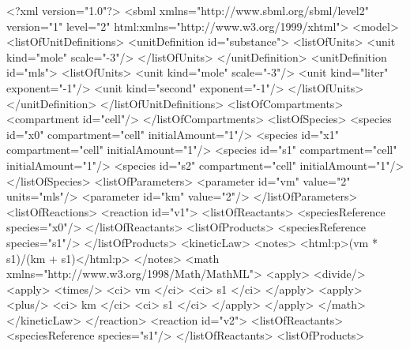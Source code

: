 \documentclass[10pt,twocolumntoc]{cekarticle}
\begin{document}
\begin{example}
<?xml version="1.0"?>
<sbml xmlns="http://www.sbml.org/sbml/level2" version="1" level="2"
      html:xmlns="http://www.w3.org/1999/xhtml">
    <model>
        <listOfUnitDefinitions>
            <unitDefinition id="substance">
                <listOfUnits>
                    <unit kind="mole" scale="-3"/>
                </listOfUnits>
            </unitDefinition>
            <unitDefinition id="mls">
                <listOfUnits>
                    <unit kind="mole"   scale="-3"/>
                    <unit kind="liter"  exponent="-1"/>
                    <unit kind="second" exponent="-1"/>
                </listOfUnits>
            </unitDefinition>
        </listOfUnitDefinitions>
        <listOfCompartments>
            <compartment id="cell"/>
        </listOfCompartments>
        <listOfSpecies>
            <species id="x0" compartment="cell" initialAmount="1"/>
            <species id="x1" compartment="cell" initialAmount="1"/>
            <species id="s1" compartment="cell" initialAmount="1"/>
            <species id="s2" compartment="cell" initialAmount="1"/>
        </listOfSpecies>
        <listOfParameters>
            <parameter id="vm" value="2" units="mls"/>
            <parameter id="km" value="2"/>
        </listOfParameters>
        <listOfReactions>
            <reaction id="v1">
                <listOfReactants>
                    <speciesReference species="x0"/>
                </listOfReactants>
                <listOfProducts>
                    <speciesReference species="s1"/>
                </listOfProducts>
                <kineticLaw>
                    <notes>
                        <html:p>(vm * s1)/(km + s1)</html:p>
                    </notes>
                    <math xmlns="http://www.w3.org/1998/Math/MathML">
                        <apply>
                            <divide/>
                            <apply>
                                <times/>
                                <ci> vm </ci>
                                <ci> s1 </ci>
                            </apply>
                            <apply>
                                <plus/>
                                <ci> km </ci>
                                <ci> s1 </ci>
                            </apply>
                        </apply>
                    </math>
                </kineticLaw>
            </reaction>
            <reaction id="v2">
                <listOfReactants>
                    <speciesReference species="s1"/>
                </listOfReactants>
                <listOfProducts>

\end{example}
\end{document}
